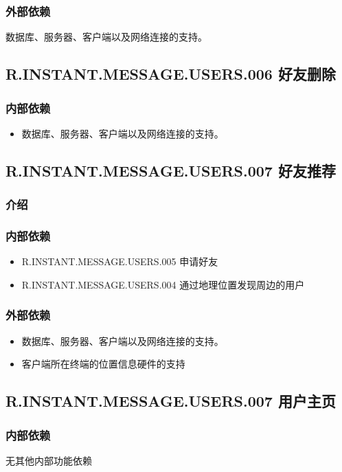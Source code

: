 \subsubsection{外部依赖}
数据库、服务器、客户端以及网络连接的支持。
{
    \color{red}
    \subsection{R.INSTANT.MESSAGE.USERS.006 好友删除}
    \subsubsection{内部依赖}
    \begin{itemize}
        \item 数据库、服务器、客户端以及网络连接的支持。
    \end{itemize}
    \subsection{R.INSTANT.MESSAGE.USERS.007 好友推荐}
    \subsubsection{介绍}
    \subsubsection{内部依赖}
    \begin{itemize}
        \item R.INSTANT.MESSAGE.USERS.005 申请好友
        \item R.INSTANT.MESSAGE.USERS.004 通过地理位置发现周边的用户
    \end{itemize}
    \subsubsection{外部依赖}
    \begin{itemize}
        \item 数据库、服务器、客户端以及网络连接的支持。
        \item 客户端所在终端的位置信息硬件的支持
    \end{itemize}

    \subsection{R.INSTANT.MESSAGE.USERS.007 用户主页}
    \subsubsection{内部依赖}
    无其他内部功能依赖
}
